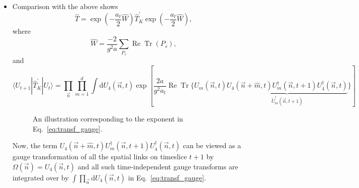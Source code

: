 \begin{itemize}
\begin{itemize}
      \begin{align}
          S_G[U] &= \# \sum_n \sum_{\mu<\nu} \operatorname{Re}\operatorname{Tr}P_{\mu \nu}(n)\nonumber \\
          &= \frac{2}{g^2}\left( \frac{a}{a_t}\sum_n \sum_{m=1}^d \operatorname{Re}\operatorname{Tr} P_{m4}(n) + \frac{a_t}{a}\sum_n \sum_{m=1}^d\sum_{l < m}\operatorname{Re}\operatorname{Tr}P_{lm}(n)\right)
      \end{align}
      where the first term comes from time-space plane plaquettes, the second term comes from plaquettes in spatial planes, and we make the lattice spacing in the $t$ direction different. We could also write
      \begin{equation}
          = \frac{\beta}{N}\{\xi\sum_{P_t}\operatorname{Re}\operatorname{Tr}(P_t) + \frac{1}{\xi} \sum_{P_s}\operatorname{Re}\operatorname{Tr}(P_s) \}
      \end{equation}
      where $\xi=a/a_t$ is the anisotropy and the sums are over the space-time plaquettes and teh space-space plaquettes, respectively..
      \item Comparison with the above shows
      \begin{equation}
          \hat{T} = \exp\left(-\frac{a_t}{2}\hat{W}\right) \hat{T}_K^\prime \exp\left(-\frac{a_t}{2}\hat{W}\right),
      \end{equation}
      where
      \begin{equation}
          \hat{W} = \frac{-2}{g^2 a}\sum_{P_s}\operatorname{Re}\operatorname{Tr}(P_s),
      \end{equation}
      and
      \begin{equation}
          \langle U_{t+1} | \hat{T}_K^\prime | U_t \rangle = \prod_{\vec{n}} \prod_{m=1}^d \int \text{d} U_4(\vec{n},t) \exp{\left[\frac{2a}{g^2 a_t}\operatorname{Re}\operatorname{Tr} \{ U_m(\vec{n},t)\underset{\widetilde{U}^\dagger_m(\vec{n},t+1)}{\underbrace{U_4(\vec{n}+\hat{m},t) U^\dagger_m(\vec{n},t+1) U^\dagger_4(\vec{n},t)}}\} \right]}
          \label{eq:transf_gauge}
      \end{equation}
      \begin{figure}
          \centering
          \caption{An illustration corresponding to the exponent in Eq.~\eqref{eq:transf_gauge}.}
          \label{fig:enter-label}
      \end{figure}
      Now, the term $U_4(\vec{n}+\hat{m}, t)U_m^\dagger(\vec{n},t+1)U_4^\dagger(\vec{n},t)$ can be viewed as a gauge transformation of all the spatial links on timeslice $t+1$ by $\Omega(\vec{n}) = U_4(\vec{n}, t)$ and all such time-independent gauge transforms are integrated over by $\int\prod_{\vec{n}}\text{d}U_4(\vec{n},t)$ in Eq.~\eqref{eq:transf_gauge}.


\end{itemize}
\end{itemize}
